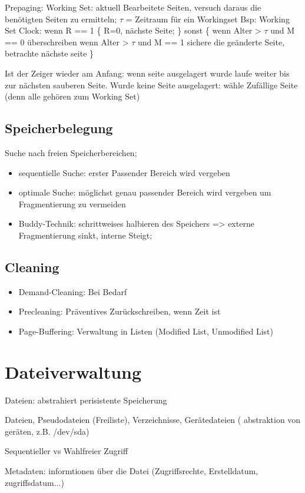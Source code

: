 Prepaging: Working Set: aktuell Bearbeitete Seiten, versuch daraus die benötigten Seiten zu ermitteln; $\tau$ = Zeitraum für ein Workingset
Bsp: Working Set Clock: 
wenn R == 1
\{ R=0, nächste Seite; \}
sonst
\{ wenn Alter > $\tau$ und M == 0 überschreiben 
   wenn Alter > $\tau $ und M == 1 sichere die geänderte Seite, betrachte nächste seite
\}


Ist der Zeiger wieder am Anfang: wenn seite ausgelagert wurde laufe weiter bis zur nächsten sauberen Seite.
Wurde keine Seite ausgelagert: wähle Zufällige Seite (denn alle gehören zum Working Set)

\subsection*{Speicherbelegung}
Suche nach freien Speicherbereichen; 
\begin{itemize}
\item sequentielle Suche: erster Passender Bereich wird vergeben
\item optimale Suche: möglichst genau passender Bereich wird vergeben um Fragmentierung zu vermeiden
\item Buddy-Technik: schrittweises halbieren des Speichers => externe Fragmentierung sinkt, interne Steigt;
\end{itemize}

\subsection*{Cleaning}
\begin{itemize}
\item Demand-Cleaning: Bei Bedarf
\item Precleaning: Präventives Zurückschreiben, wenn Zeit ist
\item Page-Buffering: Verwaltung in Listen (Modified List, Unmodified List)
\end{itemize}

\section*{Dateiverwaltung}
Dateien: abstrahiert perisistente Speicherung

Dateien, Pseudodateien (Freiliste), Verzeichnisse, Gerätedateien ( abstraktion von geräten, z.B. /dev/sda)

Sequentieller vs Wahlfreier Zugriff

Metadaten: informtionen über die Datei (Zugriffsrechte, Erstelldatum, zugriffsdatum...)


